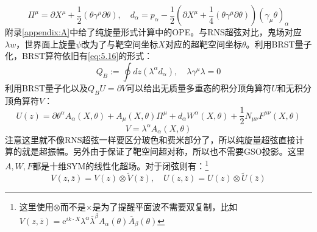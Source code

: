 \begin{equation}
	\Pi^\mu=\partial X^\mu+\frac{1}{2}(\theta\gamma^\mu\partial\theta),\quad d_\alpha=p_\alpha-\frac{1}{2}{\left(\partial X^\mu+\frac{1}{4}(\theta\gamma^\mu\partial\theta)\right)}(\gamma_\mu\theta)_\alpha
\end{equation}
附录\ref{appendix:A}中给了纯旋量形式计算中的OPE。与RNS超弦对比，鬼场对应$\lambda w$，世界面上旋量$\psi$改为了与靶空间坐标$X$对应的超靶空间坐标$\theta$。利用BRST量子化，BRST算符依旧有\ref{eq:5.16}的形式：
\begin{equation}
	Q_B:=\oint dz\left(\lambda^\alpha d_\alpha\right),\quad \lambda\gamma^\mu\lambda=0
\end{equation}
利用BRST量子化以及$Q_B U = \partial V$可以给出无质量多重态的积分顶角算符$U$和无积分顶角算符$V$：
\begin{equation}
	\label{eq:5.39}
	U(z)=\partial\theta^\alpha A_\alpha(X,\theta)+A_\mu(X,\theta)\Pi^\mu+d_\alpha W^\alpha(X,\theta)+\frac{1}{2}N_{\mu\nu}F^{\mu\nu}(X,\theta)
\end{equation}
\begin{equation}
	\label{eq:5.40}
	V=\lambda^\alpha A_\alpha(X,\theta)
\end{equation}
注意这里就不像RNS超弦一样要区分玻色和费米部分了，所以纯旋量超弦直接计算的就是超振幅。另外由于保证了靶空间超对称，所以也不需要GSO投影。这里$A,W,F$都是十维SYM的线性化超场。对于闭弦则有：\footnote{这里使用$\otimes$而不是$\times$是为了提醒平面波不需要双复制，比如$V(z,\overline{z})=\mathrm{e}^{ik\cdot X}\lambda^\alpha\overline{\lambda}^\beta A_\alpha(\theta)\overline{A}_\beta(\theta)$}
\begin{equation}
	V(z,\bar z) = V(z)\otimes \tilde V(\bar z),\quad U(z,\bar z) = U(z)\otimes \tilde U(\bar z)
\end{equation}


